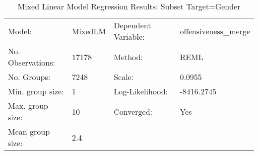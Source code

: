 \begin{table}
\caption{Mixed Linear Model Regression Results: Subset Target=Gender}
\label{}
\begin{center}
\begin{tabular}{llll}
\hline
Model:            & MixedLM & Dependent Variable: & offensiveness\_merge  \\
No. Observations: & 17178   & Method:             & REML                  \\
No. Groups:       & 7248    & Scale:              & 0.0955                \\
Min. group size:  & 1       & Log-Likelihood:     & -8416.2745            \\
Max. group size:  & 10      & Converged:          & Yes                   \\
Mean group size:  & 2.4     &                     &                       \\
\hline
\end{tabular}
\end{center}


\end{table}
